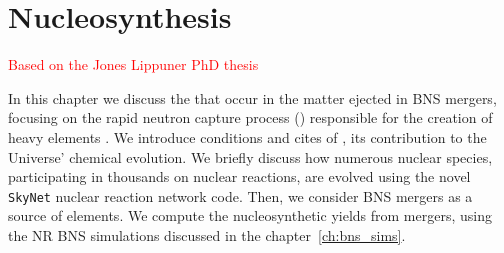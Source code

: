 
\chapter{Nucleosynthesis} \label{ch:nucleo}%


\textcolor{red}{Based on the Jones Lippuner PhD thesis}


In this chapter we discuss the \nuc{} that occur in the matter ejected in \ac{BNS}
mergers, focusing on the rapid neutron capture process (\rproc{}) responsible 
for the creation of heavy elements \citep{Burbidge:1957}. 
%
We introduce conditions and cites of \rproc{}, its contribution to the Universe' chemical evolution. 
We briefly discuss how numerous nuclear species, participating in thousands on nuclear 
reactions, are evolved using the novel \texttt{SkyNet} nuclear reaction network code. 
%
Then, we consider \ac{BNS} mergers as a source of \rproc{} elements. 
We compute the nucleosynthetic yields from mergers, using the \ac{NR} \ac{BNS} 
simulations discussed in the chapter~\ref{ch:bns_sims}.







